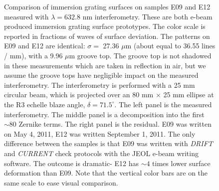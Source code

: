 \documentclass[]{spie}  %
\begin{document}
\begin{figure}
   \newline
  \caption{Comparison of immersion grating surfaces on samples E09 and E12 measured with $\lambda = 632.8 $ nm interferometry.  These are both e-beam produced immersion grating surface prototypes.  The color scale is reported in fractions of waves of surface deviation.  The patterns on E09 and E12 are identical: $\sigma = $ 27.36 $\mu$m (about equal to 36.55 lines / mm), with a 9.96 $\mu$m groove top.  The groove top is not shadowed in these measurements which are taken in reflection in air, but we assume the groove tops have negligible impact on the measured interferometry.  The interferometry is performed with a 25 mm circular beam, which is projected over an 80 mm $\times$ 25 mm ellipse at the R3 echelle blaze angle, $\delta = 71.5 ^\circ$.  The left panel is the measured interferometry.  The middle panel is a decomposition into the first $\sim 80$ Zernike terms.  The right panel is the residual.  E09 was written on May 4, 2011, E12 was written September 1, 2011.  The only difference between the samples is that E09 was written with \emph{DRIFT} and \emph{CURRENT} check protocols with the JEOL e-beam writing software.  The outcome is dramatic- E12 has $\sim 4$ times lower surface deformation than E09.  Note that the vertical color bars are on the same scale to ease visual comparison.}
  \label{fig:igrams}
\end{figure}
\end{document}
